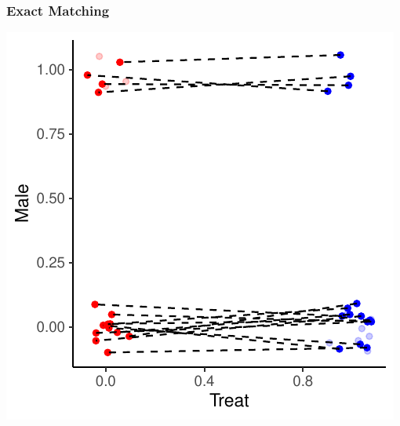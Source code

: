 \documentclass[xcolor=x11names,compress]{beamer}\usepackage[]{graphicx}\usepackage[]{color}
\makeatletter
\def\maxwidth{ %
  \ifdim\Gin@nat@width>\linewidth
    \linewidth
  \else
    \Gin@nat@width
  \fi
}
\newenvironment{knitrout}{}{} %
\renewcommand{\(}{\begin{columns}}
\renewcommand{\)}{\end{columns}}
\newcommand{\<}[1]{\begin{column}{#1}}
\renewcommand{\>}{\end{column}}
\makeatother
\begin{document}
\begin{frame}
\frametitle{Exact Matching}
\begin{center}
\begin{knitrout}
\color{fgcolor}
\includegraphics[width=\maxwidth]{figure/exact_matching_2b-1} 

\end{knitrout}
\end{center}
\end{frame}
\end{document}
